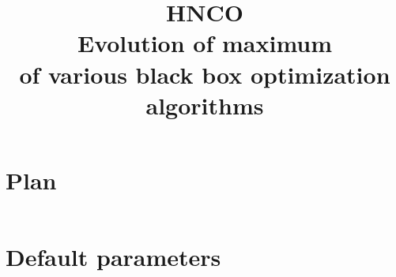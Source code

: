 \documentclass[a4paper]{article}
\begin{document}

\title{HNCO\\
  Evolution of maximum\\
  of various black box optimization algorithms}
\maketitle

\tableofcontents



\appendix

\section{Plan}

\inputminted[breaklines=true]{json}{../pretty.json}

\section{Default parameters}

\inputminted[breaklines=true]{text}{../log.defaults}
\end{document}
